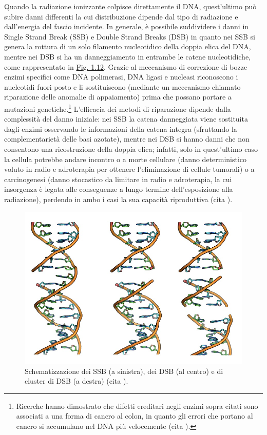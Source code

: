 \documentclass[12pt,a4paper,twoside]{report}
\begin{document}
	Quando la radiazione ionizzante colpisce direttamente il DNA, quest'ultimo può subire danni differenti la cui distribuzione dipende dal tipo di radiazione e dall'energia del fascio incidente. In generale, è possibile suddividere i danni in Single Strand Break (SSB) e Double Strand Breaks (DSB) in quanto nei SSB si genera la rottura di un solo filamento nucleotidico della doppia elica del DNA, mentre nei DSB si ha un danneggiamento in entrambe le catene nucleotidiche, come rappresentato in \hyperref[fig:danni_dna]{Fig. 1.12}. Grazie al meccanismo di correzione di bozze enzimi specifici come DNA polimerasi, DNA ligasi e nucleasi riconoscono i nucleotidi fuori posto e li sostituiscono (mediante un meccanismo chiamato riparazione delle anomalie di appaiamento) prima che possano portare a mutazioni genetiche.\footnote{Ricerche hanno dimostrato che difetti ereditari negli enzimi sopra citati sono associati a una forma di cancro al colon, in quanto gli errori che portano al cancro si accumulano nel DNA più velocemente (cita
	).} L'efficacia dei metodi di riparazione dipende dalla complessità del danno iniziale: nei SSB la catena danneggiata viene sostituita dagli enzimi osservando le informazioni della catena integra (sfruttando la complementarietà delle basi azotate), mentre nei DSB si hanno danni che non consentono una ricostruzione della doppia elica; infatti, solo in quest'ultimo caso la cellula potrebbe andare incontro o a morte cellulare (danno deterministico voluto in radio e adroterapia per ottenere l'eliminazione di cellule tumorali) o a carcinogenesi (danno stocastico da limitare in radio e adroterapia, la cui insorgenza è legata alle conseguenze a lungo termine dell'esposizione alla radiazione), perdendo in ambo i casi la sua capacità riproduttiva (cita
	).
	
	\begin{figure}[H]
		\centering
		\includegraphics[width=0.9\linewidth]{danni_dna.jpg}
		\caption{Schematizzazione dei SSB (a sinistra), dei DSB (al centro) e di cluster di DSB (a destra) (cita
			).}
		\label{fig:danni_dna}
	\end{figure}
	
\end{document}
